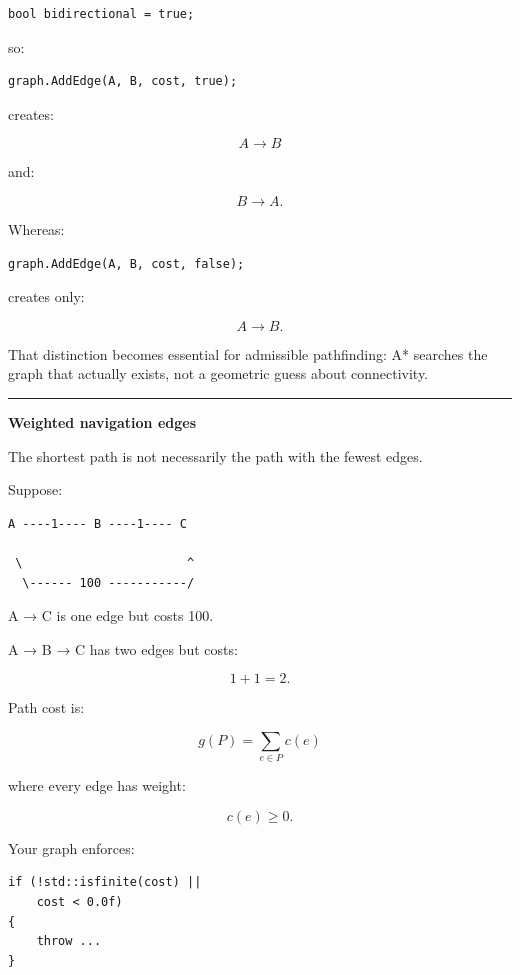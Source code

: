 \begin{verbatim}
bool bidirectional = true;
\end{verbatim}

so:

\begin{verbatim}
graph.AddEdge(A, B, cost, true);
\end{verbatim}

creates:

\[
A\rightarrow B
\]

and:

\[
B\rightarrow A.
\]

Whereas:

\begin{verbatim}
graph.AddEdge(A, B, cost, false);
\end{verbatim}

creates only:

\[
A\rightarrow B.
\]

That distinction becomes essential for admissible pathfinding: A* searches the graph that actually exists, not a geometric guess about connectivity.

\begin{center}\rule{0.5\linewidth}{0.5pt}\end{center}

\textbf{Weighted navigation edges}

The shortest path is not necessarily the path with the fewest edges.

Suppose:

\begin{verbatim}
A ----1---- B ----1---- C

 \                       ^
  \------ 100 -----------/
\end{verbatim}

A → C is one edge but costs 100.

A → B → C has two edges but costs:

\[
1+1=2.
\]

Path cost is:

\[
\boxed{
g(P)=
\sum_{e\in P}c(e)
}
\]

where every edge has weight:

\[
c(e)\ge0.
\]

Your graph enforces:

\begin{verbatim}
if (!std::isfinite(cost) ||
    cost < 0.0f)
{
    throw ...
}
\end{verbatim}

